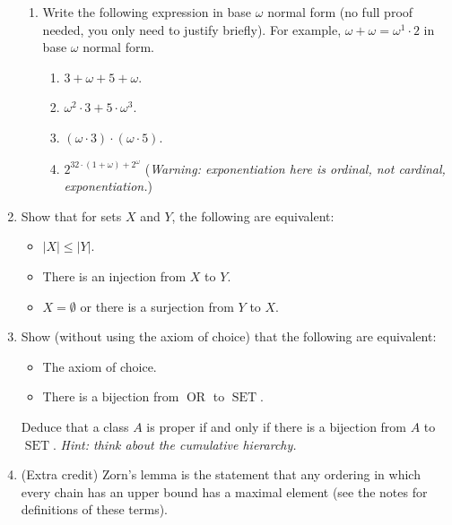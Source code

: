 \documentclass{amsart}
\theoremstyle{definition}
\newcommand{\Set}{\operatorname{SET}}
\newcommand{\Or}{\operatorname{OR}}
\newcommand{\OR}{\Or}
\begin{document}
\begin{enumerate}
\begin{enumerate}
\item Write the following expression in base $\omega$ normal form (no full proof needed, you only need to justify briefly). For example, $\omega + \omega = \omega^1 \cdot 2$ in base $\omega$ normal form.
  \begin{enumerate}
  \item $3 + \omega + 5 + \omega$.
  \item $\omega^2 \cdot 3 + 5 \cdot \omega^3$.
  \item $(\omega \cdot 3) \cdot (\omega \cdot 5)$.
  \item $2^{32 \cdot (1 + \omega) + 2^\omega}$ (\emph{Warning: exponentiation here is ordinal, not cardinal, exponentiation.})
  \end{enumerate}
\end{enumerate}
\item Show that for sets $X$ and $Y$, the following are equivalent:

  \begin{itemize}
  \item $|X| \le |Y|$.
  \item There is an injection from $X$ to $Y$.
  \item $X = \emptyset$ or there is a surjection from $Y$ to $X$.    
  \end{itemize}

\item Show (without using the axiom of choice) that the following are equivalent:

  \begin{itemize}
  \item The axiom of choice.
  \item There is a bijection from $\OR$ to $\Set$.
  \end{itemize}

  Deduce that a class $A$ is proper if and only if there is a bijection from $A$ to $\Set$. \emph{Hint: think about the cumulative hierarchy.}
\item (Extra credit) Zorn's lemma is the statement that any ordering in which every chain has an upper bound has a maximal element (see the notes for definitions of these terms).


\end{enumerate}
\end{document}
